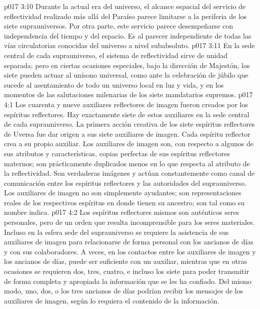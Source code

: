 \vs p017 3:10 \pc Durante la actual era del universo, el alcance espacial del servicio de reflectividad realizado más allá del Paraíso parece limitarse a la periferia de los siete suprauniversos. Por otra parte, este servicio parece desempeñarse con independencia del tiempo y del espacio. Es al parecer independiente de todas las vías circulatorias conocidas del universo a nivel subabsoluto.
\vs p017 3:11 En la sede central de cada suprauniverso, el sistema de reflectividad sirve de unidad separada; pero en ciertas ocasiones especiales, bajo la dirección de Majestón, los siete pueden actuar al unísono universal, como ante la celebración de júbilo que sucede al asentamiento de todo un universo local en luz y vida, y en los momentos de las salutaciones milenarias de los siete mandatarios supremos.
\vs p017 4:1 Los cuarenta y nueve auxiliares reflectores de imagen fueron creados por los espíritus reflectores. Hay exactamente siete de estos auxiliares en la sede central de cada suprauniverso. La primera acción creativa de los siete espíritus reflectores de Uversa fue dar origen a sus siete auxiliares de imagen. Cada espíritu reflector crea a su propio auxiliar. Los auxiliares de imagen son, con respecto a algunos de sus atributos y características, copias perfectas de sus espíritus reflectores maternos; son prácticamente duplicados menos en lo que respecta al atributo de la reflectividad. Son verdaderas imágenes y actúan constantemente como canal de comunicación entre los espíritus reflectores y las autoridades del suprauniverso. Los auxiliares de imagen no son simplemente ayudantes; son representaciones reales de los respectivos espíritus en donde tienen su ancestro; son  tal como su nombre indica.
\vs p017 4:2 Los espíritus reflectores mismos son auténticos seres personales, pero de un orden que resulta incomprensible para los seres materiales. Incluso en la esfera sede del suprauniverso se requiere la asistencia de sus auxiliares de imagen para relacionarse de forma personal con los ancianos de días y con sus colaboradores. A veces, en los contactos entre los auxiliares de imagen y los ancianos de días, puede ser suficiente con un auxiliar, mientras que en otras ocasiones se requieren dos, tres, cuatro, e incluso los siete para poder transmitir de forma completa y apropiada la información que se les ha confiado. Del mismo modo, uno, dos, o los tres ancianos de días podrían recibir los mensajes de los auxiliares de imagen, según lo requiera el contenido de la información.

